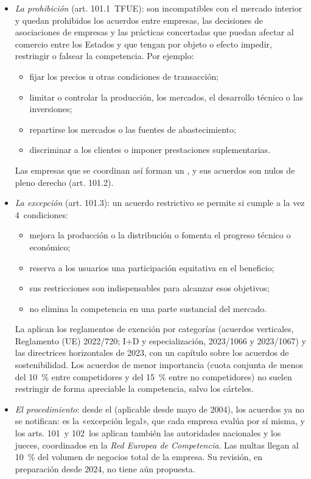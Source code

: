 \documentclass[11pt]{article}
\begin{document}
\begin{itemize}
\item \emph{La prohibición} (art. 101.1~TFUE): son incompatibles con el mercado interior y quedan prohibidos los acuerdos entre empresas, las decisiones de asociaciones de empresas y las prácticas concertadas que puedan afectar al comercio entre los Estados y que tengan por objeto o efecto impedir, restringir o falsear la competencia. Por ejemplo:
  \begin{itemize}
  \item fijar los precios u otras condiciones de transacción;
  \item limitar o controlar la producción, los mercados, el desarrollo técnico o las inversiones;
  \item repartirse los mercados o las fuentes de abastecimiento;
  \item discriminar a los clientes o imponer prestaciones suplementarias.
  \end{itemize}
  Las empresas que se coordinan así forman un , y sus acuerdos son nulos de pleno derecho (art. 101.2).
\item \emph{La excepción} (art. 101.3): un acuerdo restrictivo se permite si cumple a la vez 4~condiciones:
  \begin{itemize}
  \item mejora la producción o la distribución o fomenta el progreso técnico o económico;
  \item reserva a los usuarios una participación equitativa en el beneficio;
  \item sus restricciones son indispensables para alcanzar esos objetivos;
  \item no elimina la competencia en una parte sustancial del mercado.
  \end{itemize}
  La aplican los reglamentos de exención por categorías (acuerdos verticales, Reglamento (UE) 2022/720; I+D y especialización, 2023/1066 y 2023/1067) y las directrices horizontales de 2023, con un capítulo sobre los acuerdos de sostenibilidad. Los acuerdos de menor importancia (cuota conjunta de menos del 10~\% entre competidores y del 15~\% entre no competidores) no suelen restringir de forma apreciable la competencia, salvo los cárteles\nocite{CE2014Minimis}.
\item \emph{El procedimiento}: desde el  (aplicable desde mayo de 2004), los acuerdos ya no se notifican: es la «excepción legal», que cada empresa evalúa por sí misma, y los arts. 101~y 102~los aplican también las autoridades nacionales y los jueces, coordinados en la \emph{Red Europea de Competencia}. Las multas llegan al 10~\% del volumen de negocios total de la empresa\nocite{UE2003Reglamento1}. Su revisión, en preparación desde 2024, no tiene aún propuesta.

\end{itemize}
\end{document}
